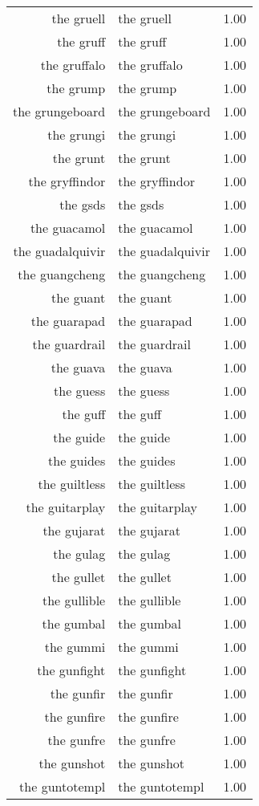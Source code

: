 \begin{table}[ht]
\begin{tabular}{rlr}
  the gruell & the gruell & 1.00 \\ 
  the gruff & the gruff & 1.00 \\ 
  the gruffalo & the gruffalo & 1.00 \\ 
  the grump & the grump & 1.00 \\ 
  the grungeboard & the grungeboard & 1.00 \\ 
  the grungi & the grungi & 1.00 \\ 
  the grunt & the grunt & 1.00 \\ 
  the gryffindor & the gryffindor & 1.00 \\ 
  the gsds & the gsds & 1.00 \\ 
  the guacamol & the guacamol & 1.00 \\ 
  the guadalquivir & the guadalquivir & 1.00 \\ 
  the guangcheng & the guangcheng & 1.00 \\ 
  the guant & the guant & 1.00 \\ 
  the guarapad & the guarapad & 1.00 \\ 
  the guardrail & the guardrail & 1.00 \\ 
  the guava & the guava & 1.00 \\ 
  the guess & the guess & 1.00 \\ 
  the guff & the guff & 1.00 \\ 
  the guide & the guide & 1.00 \\ 
  the guides & the guides & 1.00 \\ 
  the guiltless & the guiltless & 1.00 \\ 
  the guitarplay & the guitarplay & 1.00 \\ 
  the gujarat & the gujarat & 1.00 \\ 
  the gulag & the gulag & 1.00 \\ 
  the gullet & the gullet & 1.00 \\ 
  the gullible & the gullible & 1.00 \\ 
  the gumbal & the gumbal & 1.00 \\ 
  the gummi & the gummi & 1.00 \\ 
  the gunfight & the gunfight & 1.00 \\ 
  the gunfir & the gunfir & 1.00 \\ 
  the gunfire & the gunfire & 1.00 \\ 
  the gunfre & the gunfre & 1.00 \\ 
  the gunshot & the gunshot & 1.00 \\ 
  the guntotempl & the guntotempl & 1.00 \\ 

\end{tabular}
\end{table}
